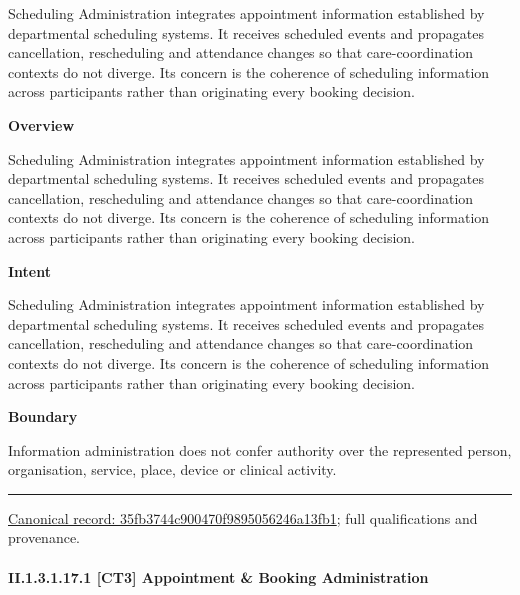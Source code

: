 Scheduling Administration integrates appointment information established by departmental scheduling systems. It receives scheduled events and propagates cancellation, rescheduling and attendance changes so that care-coordination contexts do not diverge. Its concern is the coherence of scheduling information across participants rather than originating every booking decision.



\textbf{Overview}



Scheduling Administration integrates appointment information established by departmental scheduling systems. It receives scheduled events and propagates cancellation, rescheduling and attendance changes so that care-coordination contexts do not diverge. Its concern is the coherence of scheduling information across participants rather than originating every booking decision.



\textbf{Intent}



Scheduling Administration integrates appointment information established by departmental scheduling systems. It receives scheduled events and propagates cancellation, rescheduling and attendance changes so that care-coordination contexts do not diverge. Its concern is the coherence of scheduling information across participants rather than originating every booking decision.



\textbf{Boundary}



Information administration does not confer authority over the represented person, organisation, service, place, device or clinical activity.



\medskip\hrule\medskip

{\footnotesize \href{../../../../continuum/strategy/capability/35fb3744c900470f9895056246a13fb1.md}{Canonical record: 35fb3744c900470f9895056246a13fb1}; full qualifications and provenance.}\par
\paragraph*{II.1.3.1.17.1 [CT3] Appointment \& Booking Administration}
\label{navigation:II.1.3.1.17.1}

